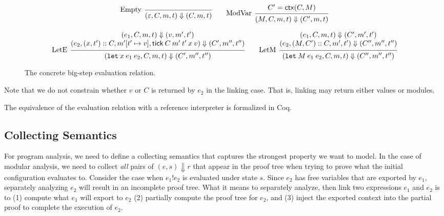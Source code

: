 \documentclass[acmsmall,review]{acmart}\settopmatter{printfolios=true,printccs=false,printacmref=false}
\theoremstyle{definition}
\newcommand*{\cons}{::}
\newcommand*{\mem}{m}
\newcommand*{\link}[2]{{#1}\mathtt{!}{#2}}
\newcommand*{\tick}{\mathsf{tick}}
\newcommand*{\modctx}{\mathsf{ctx}}
\begin{document}
\begin{figure}[h!]
  \[
    \begin{prooftree}
      \infer[left label=Empty]0{
      (\varepsilon, C, \mem, t)
      \Downarrow
      (C, \mem, t)
      }
    \end{prooftree}\qquad
    \begin{prooftree}
      \hypo{C'=\modctx(C,M)}
      \infer[left label=ModVar]1{
      (M, C, \mem, t)
      \Downarrow
      (C', \mem, t)
      }
    \end{prooftree}
  \]

  \[
    \begin{prooftree}
      \hypo{
        \begin{matrix}
          (e_{1}, C, \mem, t)
          \Downarrow
          (v, \mem', t') \\
          (e_{2}, (x, t')\cons C, \mem'[t'\mapsto v], \tick\:C\:\mem'\:t'\:x\:v)
          \Downarrow
          (C', \mem'', t'')
        \end{matrix}
      }
      \infer[left label=LetE]1{
      (\mathtt{let}\:x\:e_1\:e_2, C, \mem, t)
      \Downarrow
      (C', \mem'', t'')
      }
    \end{prooftree}\qquad
    \begin{prooftree}
      \hypo{
        \begin{matrix}
          (e_{1}, C, \mem, t)
          \Downarrow
          (C', \mem', t') \\
          (e_{2}, (M, C')\cons C, \mem', t')
          \Downarrow
          (C'', \mem'', t'')
        \end{matrix}
      }
      \infer[left label=LetM]1{
      (\mathtt{let}\:M\:e_{1}\:e_{2}, C, \mem, t)
      \Downarrow
      (C'', \mem'', t'')
      }
    \end{prooftree}
  \]
  \caption{The concrete big-step evaluation relation.}
  \label{fig:conceval}
\end{figure}
Note that we do not constrain whether $v$ or $C$ is returned by $e_{2}$ in the linking case.
That is, linking may return either values or modules.

The equivalence of the evaluation relation with a reference interpreter is formalized in Coq.

\subsection{Collecting Semantics}

For program analysis, we need to define a collecting semantics that captures the strongest property we want to model.
In the case of modular analysis, we need to collect \emph{all} pairs of $(e,s)\Downarrow r$ that appear in the proof tree when trying to prove what the initial configuration evaluates to.
Consider the case when $\link{e_1}{e_2}$ is evaluated under state $s$.
Since $e_2$ has free variables that are exported by $e_1$, separately analyzing $e_2$ will result in an incomplete proof tree.
What it means to separately analyze, then link two expressions $e_1$ and $e_2$ is to (1) compute what $e_1$ will export to $e_2$ (2) partially compute the proof tree for $e_2$, and (3) inject the exported context into the partial proof to complete the execution of $e_2$.
\end{document}
